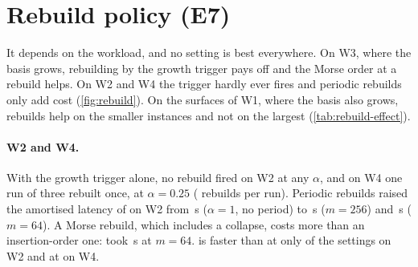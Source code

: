 \section{Rebuild policy (E7)}\label{sec:s-rebuild}\label{sec:e7}


It depends on the workload, and no setting is best everywhere. On W3, where the
basis grows, rebuilding by the growth trigger pays off and the Morse order at a
rebuild helps. On W2 and W4 the trigger hardly ever fires and periodic rebuilds
only add cost (\cref{fig:rebuild}). On the surfaces of W1, where
the basis also grows, rebuilds help on the smaller instances and not on the
largest (\cref{tab:rebuild-effect}).

\paragraph{W2 and W4.} With the growth trigger alone, no rebuild fired on W2 at
any $\alpha$, and on W4 one  run of three rebuilt once, at
$\alpha=0.25$ (\NumESevenWFourPlaneNSixteenThousandDTwoMmhmAQuarterPOffRebuilds{}
rebuilds per run). Periodic rebuilds raised the amortised latency of
 on W2 from \NumESevenWTwoNTwentyTwoSEightMmhmAOnePOffAmort\,\textmu s
($\alpha=1$, no period) to
\NumESevenWTwoNTwentyTwoSEightMmhmAOnePTwoHundredFiftySixAmort\,\textmu s
($m=256$) and \NumESevenWTwoNTwentyTwoSEightMmhmAOnePSixtyFourAmort\,\textmu s
($m=64$). A Morse rebuild, which includes a collapse, costs more than an
insertion-order one:  took
\NumESevenWTwoNTwentyTwoSEightDrbIdRbAOnePSixtyFourAmort\,\textmu s at $m=64$.
 is faster than  at only
\NumESevenWTwoNTwentyTwoSEightMmhmBelowDrbIdRb{} of the
\NumESevenWTwoNTwentyTwoSEightSettings{} settings on W2 and at
\NumESevenWFourPlaneNSixteenThousandDTwoMmhmBelowDrbIdRb{} on W4.

